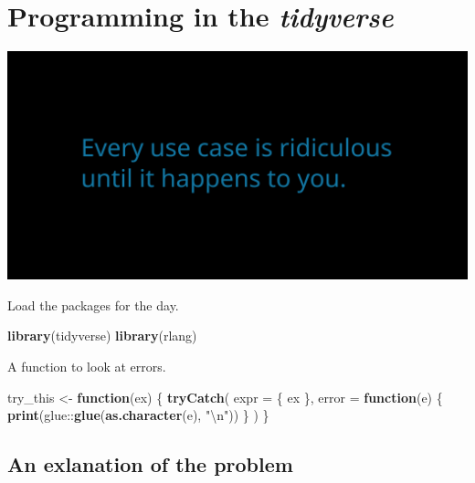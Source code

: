 \documentclass[]{book}
\newenvironment{Shaded}{}{}
\newcommand{\CharTok}[1]{\textcolor[rgb]{0.25,0.44,0.63}{#1}}
\newcommand{\ControlFlowTok}[1]{\textcolor[rgb]{0.00,0.44,0.13}{\textbf{#1}}}
\newcommand{\DataTypeTok}[1]{\textcolor[rgb]{0.56,0.13,0.00}{#1}}
\newcommand{\KeywordTok}[1]{\textcolor[rgb]{0.00,0.44,0.13}{\textbf{#1}}}
\newcommand{\NormalTok}[1]{#1}
\newcommand{\OperatorTok}[1]{\textcolor[rgb]{0.40,0.40,0.40}{#1}}
\newcommand{\StringTok}[1]{\textcolor[rgb]{0.25,0.44,0.63}{#1}}
\begin{document}
\hypertarget{programming-in-the-tidyverse}{%
\chapter{\texorpdfstring{Programming in the \emph{tidyverse}}{Programming in the tidyverse}}\label{programming-in-the-tidyverse}}

\includegraphics{opening-image.png}

Load the packages for the day.

\begin{Shaded}
\begin{Highlighting}[]
\KeywordTok{library}\NormalTok{(tidyverse)}
\KeywordTok{library}\NormalTok{(rlang)}
\end{Highlighting}
\end{Shaded}

A function to look at errors.

\begin{Shaded}
\begin{Highlighting}[]
\NormalTok{try_this <-}\StringTok{ }\ControlFlowTok{function}\NormalTok{(ex) \{}
  \KeywordTok{tryCatch}\NormalTok{(}
    \DataTypeTok{expr =}\NormalTok{ \{}
\NormalTok{      ex}
\NormalTok{    \},}
    \DataTypeTok{error =} \ControlFlowTok{function}\NormalTok{(e) \{}
      \KeywordTok{print}\NormalTok{(glue}\OperatorTok{::}\KeywordTok{glue}\NormalTok{(}\KeywordTok{as.character}\NormalTok{(e), }\StringTok{"}\CharTok{\textbackslash{}n}\StringTok{"}\NormalTok{))}
\NormalTok{    \}}
\NormalTok{  )}
\NormalTok{\}}
\end{Highlighting}
\end{Shaded}

\hypertarget{an-exlanation-of-the-problem}{%
\section{An exlanation of the problem}\label{an-exlanation-of-the-problem}}
\end{document}
